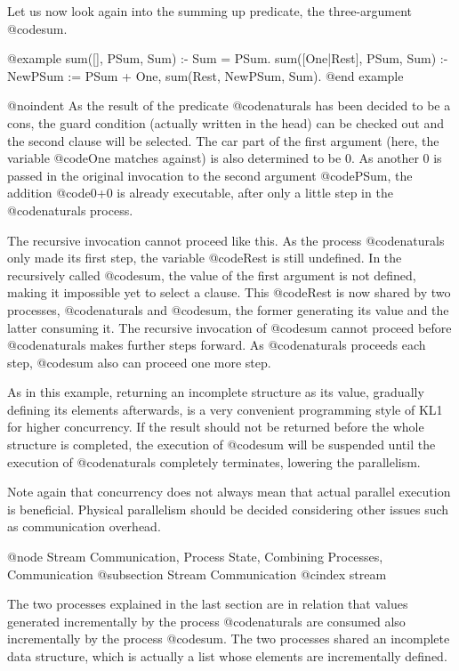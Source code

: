{Let us now look again into the summing up predicate, the three-argument
@code{sum}.

@example
sum([], PSum, Sum) :- Sum = PSum.
sum([One|Rest], PSum, Sum) :-
    NewPSum := PSum + One,
    sum(Rest, NewPSum, Sum).
@end example

@noindent
As the result of the predicate @code{naturals} has been decided to be a
cons, the guard condition (actually written in the head) can be checked
out and the second clause will be selected.  The car part of the first
argument (here, the variable @code{One} matches against) is also
determined to be 0.  As another 0 is passed in the original invocation
to the second argument @code{PSum}, the addition @code{0+0} is already
executable, after only a little step in the @code{naturals} process.

The recursive invocation cannot proceed like this.  As the process
@code{naturals} only made its first step, the variable @code{Rest} is
still undefined.  In the recursively called @code{sum}, the value of the
first argument is not defined, making it impossible yet to select a
clause.  This @code{Rest} is now shared by two processes,
@code{naturals} and @code{sum}, the former generating its value and the
latter consuming it.  The recursive invocation of @code{sum} cannot
proceed before @code{naturals} makes further steps forward.  As
@code{naturals} proceeds each step, @code{sum} also can proceed one more
step.

As in this example, returning an incomplete structure as its value,
gradually defining its elements afterwards, is a very convenient
programming style of KL1 for higher concurrency.  If the result should
not be returned before the whole structure is completed, the execution
of @code{sum} will be suspended until the execution of @code{naturals}
completely terminates, lowering the parallelism.

Note again that concurrency does not always mean that actual parallel
execution is beneficial.  Physical parallelism should be decided
considering other issues such as communication overhead.

@node Stream Communication, Process State, Combining Processes, Communication
@subsection Stream Communication
@cindex stream

The two processes explained in the last section are in relation that
values generated incrementally by the process @code{naturals} are
consumed also incrementally by the process @code{sum}.  The two
processes shared an incomplete data structure, which is actually a list
whose elements are incrementally defined.

}
